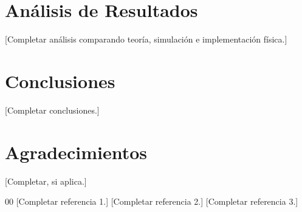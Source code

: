 \documentclass[conference]{IEEEtran}
\begin{document}
\section{Análisis de Resultados}
[Completar análisis comparando teoría, simulación e implementación física.]

\section{Conclusiones}
[Completar conclusiones.]

\section*{Agradecimientos}
[Completar, si aplica.]

\begin{thebibliography}{00}
 [Completar referencia 1.]
 [Completar referencia 2.]
 [Completar referencia 3.]
\end{thebibliography}
\end{document}
